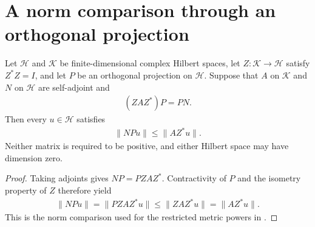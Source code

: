 \section{A norm comparison through an orthogonal projection}

\begin{theorem}
    \label{thm:projection_intertwining_norm}
    \leanok
    Let $\mathcal H$ and $\mathcal K$ be finite-dimensional complex Hilbert
    spaces, let $Z:\mathcal K\to\mathcal H$ satisfy $Z^*Z=I$, and let
    $P$ be an orthogonal projection on $\mathcal H$. Suppose that $A$ on
    $\mathcal K$ and $N$ on $\mathcal H$ are self-adjoint and
    \begin{align*}
        (ZAZ^*)P=PN.
    \end{align*}
    Then every $u\in\mathcal H$ satisfies
    \begin{align*}
        \|NPu\|\le \|AZ^*u\|.
    \end{align*}
    Neither matrix is required to be positive, and either Hilbert space
    may have dimension zero.
\end{theorem}
\begin{proof}\leanok
    Taking adjoints gives $NP=PZAZ^*$. Contractivity of $P$ and the
    isometry property of $Z$ therefore yield
    \begin{align*}
        \|NPu\|=\|PZAZ^*u\|\le\|ZAZ^*u\|=\|AZ^*u\|.
    \end{align*}
    This is the norm comparison used for the restricted metric powers in
    \cite[\texttt{07-comparators.tex}, lines 283--308 and 370--381]{OpenAI2026AreaLaw}.
\end{proof}
